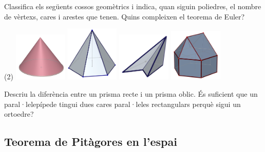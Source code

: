 \begin{activitats}
\begin{mylist}
\exer  Classifica els següents cossos geomètrics i indica, quan siguin poliedres, el nombre de vèrtexs, cares i arestes que tenen. Quins compleixen el teorema de Euler?
\begin{tasks}(2) 
\task \includegraphics[width=1in]{img-11/con}
\task \includegraphics[width=1in]{img-11/piramide-hexagonal}
\task \includegraphics[width=1in]{img-11/poliedre11}
\task \includegraphics[width=1in]{img-11/raro}
\end{tasks}

\exer  Descriu la diferència entre un prisma recte i un prisma oblic. És suficient que un paral·lelepípede tingui dues cares paral·leles rectangulars perquè sigui un ortoedre?

 
\end{mylist}

\columnbreak
\subsection{Teorema de Pitàgores en l'espai}


\end{activitats}
